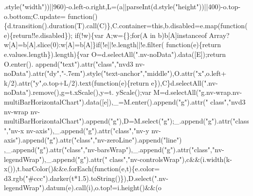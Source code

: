 \begin{DoxyCode}
      .style(\textcolor{stringliteral}{"width"}))||960)-o.left-o.right,L=(a||parseInt(d.style(\textcolor{stringliteral}{"height"}))||400)-o.top-o.bottom;C.update=\textcolor{keyword}{
      function}()\{d.transition().duration(T).call(C)\},C.container=\textcolor{keyword}{this},b.disabled=e.map(\textcolor{keyword}{function}(e)\{\textcolor{keywordflow}{return}!!e.disabled\});\textcolor{keywordflow}{
      if}(!w)\{var A;w=\{\};\textcolor{keywordflow}{for}(A in b)b[A]instanceof Array?w[A]=b[A].slice(0):w[A]=b[A]\}\textcolor{keywordflow}{if}(!e||!e.length||!e.filter(\textcolor{keyword}{
      function}(e)\{return e.values.length\}).length)\{var O=d.selectAll(\textcolor{stringliteral}{".nv-noData"}).data([E]);\textcolor{keywordflow}{return} O.enter().
      append(\textcolor{stringliteral}{"text"}).attr(\textcolor{stringliteral}{"class"},\textcolor{stringliteral}{"nvd3 nv-noData"}).attr(\textcolor{stringliteral}{"dy"},\textcolor{stringliteral}{"-.7em"}).style(\textcolor{stringliteral}{"text-anchor"},\textcolor{stringliteral}{"middle"}),O.attr(\textcolor{stringliteral}{"x"},o.left+
      k/2).attr(\textcolor{stringliteral}{"y"},o.top+L/2).text(\textcolor{keyword}{function}(e)\{\textcolor{keywordflow}{return} e\}),C\}d.selectAll(\textcolor{stringliteral}{".nv-noData"}).remove(),g=t.xScale(),y=t.
      yScale();var M=d.selectAll(\textcolor{stringliteral}{"g.nv-wrap.nv-multiBarHorizontalChart"}).data([e]),\_=M.enter().append(\textcolor{stringliteral}{"g"}).attr(\textcolor{stringliteral}{"
      class"},\textcolor{stringliteral}{"nvd3 nv-wrap nv-multiBarHorizontalChart"}).append(\textcolor{stringliteral}{"g"}),D=M.select(\textcolor{stringliteral}{"g"});\_.append(\textcolor{stringliteral}{"g"}).attr(\textcolor{stringliteral}{"class"},\textcolor{stringliteral}{"nv-x
       nv-axis"}),\_.append(\textcolor{stringliteral}{"g"}).attr(\textcolor{stringliteral}{"class"},\textcolor{stringliteral}{"nv-y nv-axis"}).append(\textcolor{stringliteral}{"g"}).attr(\textcolor{stringliteral}{"class"},\textcolor{stringliteral}{"nv-zeroLine"}).append(\textcolor{stringliteral}{"line"})
      ,\_.append(\textcolor{stringliteral}{"g"}).attr(\textcolor{stringliteral}{"class"},\textcolor{stringliteral}{"nv-barsWrap"}),\_.append(\textcolor{stringliteral}{"g"}).attr(\textcolor{stringliteral}{"class"},\textcolor{stringliteral}{"nv-legendWrap"}),\_.append(\textcolor{stringliteral}{"g"}).attr(\textcolor{stringliteral}{"
      class"},\textcolor{stringliteral}{"nv-controlsWrap"}),c&&(i.width(k-x()),t.barColor()&&e.forEach(\textcolor{keyword}{function}(e,t)\{e.color=
      d3.rgb(\textcolor{stringliteral}{"#ccc"}).darker(t*1.5).toString()\}),D.select(\textcolor{stringliteral}{".nv-legendWrap"}).datum(e).call(i),o.top!=i.height()&&(o

\end{DoxyCode}
